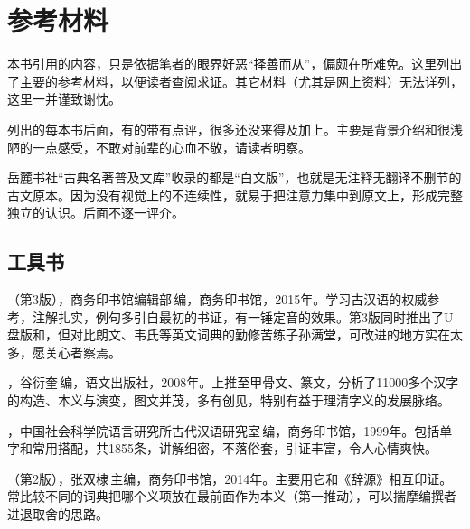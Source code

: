 \chapter*{参\quad 考\quad 材\quad 料}

本书引用的内容，只是依据笔者的眼界好恶“择善而从”，偏颇在所难免。这里列出了主要的参考材料，以便读者查阅求证。其它材料（尤其是网上资料）无法详列，这里一并谨致谢忱。

列出的每本书后面，有的带有点评，很多还没来得及加上。主要是背景介绍和很浅陋的一点感受，不敢对前辈的心血不敬，请读者明察。

岳麓书社“古典名著普及文库”收录的都是“白文版”，也就是无注释无翻译不删节的古文原本。因为没有视觉上的不连续性，就易于把注意力集中到原文上，形成完整独立的认识。后面不逐一评介。


\lypdfbookmark\section*{工具书}

（第3版），商务印书馆编辑部\,编，商务印书馆，2015年。学习古汉语的权威参考，注解扎实，例句多引自最初的书证，有一锤定音的效果。第3版同时推出了U盘版和，但对比朗文、韦氏等英文词典的勤修苦练子孙满堂，可改进的地方实在太多，愿关心者察焉。

，谷衍奎\,编，语文出版社，2008年。上推至甲骨文、篆文，分析了11000多个汉字的构造、本义与演变，图文并茂，多有创见，特别有益于理清字义的发展脉络。

，中国社会科学院语言研究所古代汉语研究室\,编，商务印书馆，1999年。包括单字和常用搭配，共1855条，讲解细密，不落俗套，引证丰富，令人心情爽快。

（第2版），张双棣\,主编，商务印书馆，2014年。主要用它和《辞源》相互印证。常比较不同的词典把哪个义项放在最前面作为本义（第一推动），可以揣摩编撰者进退取舍的思路。

